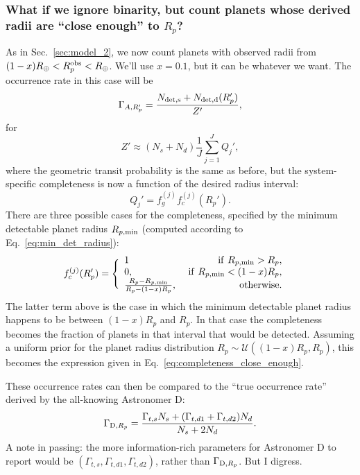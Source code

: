 \documentclass{emulateapj}
\begin{document}
\subsubsection{What if we ignore binarity, but count planets whose derived 
radii are ``close enough'' to $R_p$?}
\label{subsubsec:close_enough}

As in Sec.~\ref{sec:model_2}, we now count planets with observed radii from 
$(1-x)R_\oplus < R_p^{\rm obs} < R_\oplus$. We'll use $x=0.1$, but it can be 
whatever we want.
The occurrence rate in this case will be
\begin{equation}
\Gamma_{A,R_p'} = \frac{N_{\rm det,s} + N_{\rm det,d}(R_p')}{Z'},
\end{equation}
for
\begin{equation}
Z' \approx (N_s + N_d) \frac{1}{J} \sum_{j=1}^{J} Q_j',
\end{equation}
where the geometric transit probability is the same as before, but the 
system-specific completeness is now a function of the desired radius interval:
\begin{equation}
Q_j' = f_g^{(j)} f_c^{(j)}(R_p').
\end{equation}
There are three possible cases for the completeness, specified by the minimum 
detectable planet radius $R_{p,{\rm min}}$ (computed according to 
Eq.~\ref{eq:min_det_radius}):
\begin{align}
f_c^{(j)}(R_p') &= 
\Bigg\{\begin{array}{lr}
1 & {\rm\ if\ }R_{p,{\rm min}}>R_p,\\
0, & {\rm\ if\ }R_{p,{\rm min}}<(1-x)R_p,\\
\frac{R_p - R_{p,{\rm min}}}{R_p - (1-x)R_p}, &{\rm otherwise}.
\end{array}
\label{eq:completeness_close_enough}
\end{align}
The latter term above is the case in which the minimum detectable planet 
radius happens to be between $(1-x)R_p$ and $R_p$. In that case the 
completeness becomes the fraction of planets in that interval that would be 
detected.
Assuming a uniform prior for the planet radius distribution $R_p \sim 
\mathcal{U}((1-x)R_p, R_p)$, this becomes the expression given in 
Eq.~\ref{eq:completeness_close_enough}.

These occurrence rates can then be compared to the ``true occurrence rate'' 
derived by the all-knowing Astronomer D:
\begin{equation}
\Gamma_{{\rm D}, R_p} = \frac{\Gamma_{t,s} N_s + (\Gamma_{t,d1} + 
						\Gamma_{t,d2})N_d}{N_s + 2 N_d}.
\end{equation}
A note in passing: the more information-rich parameters for Astronomer D to 
report would be $(\Gamma_{t,s}, \Gamma_{t,d1}, \Gamma_{t,d2})$, rather than 
$\Gamma_{{\rm D}, R_p}$. But I digress.
\end{document}
